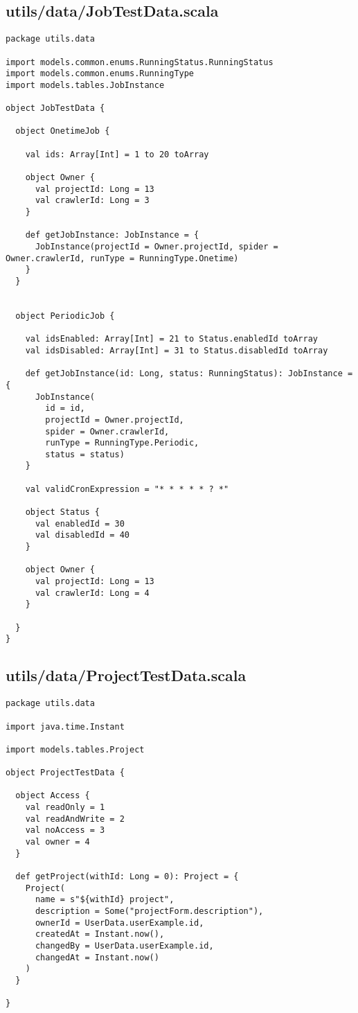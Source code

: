 \subsection{utils/data/JobTestData.scala}
\begin{lstlisting}
package utils.data

import models.common.enums.RunningStatus.RunningStatus
import models.common.enums.RunningType
import models.tables.JobInstance

object JobTestData {

  object OnetimeJob {

    val ids: Array[Int] = 1 to 20 toArray

    object Owner {
      val projectId: Long = 13
      val crawlerId: Long = 3
    }

    def getJobInstance: JobInstance = {
      JobInstance(projectId = Owner.projectId, spider = Owner.crawlerId, runType = RunningType.Onetime)
    }
  }


  object PeriodicJob {

    val idsEnabled: Array[Int] = 21 to Status.enabledId toArray
    val idsDisabled: Array[Int] = 31 to Status.disabledId toArray

    def getJobInstance(id: Long, status: RunningStatus): JobInstance = {
      JobInstance(
        id = id,
        projectId = Owner.projectId,
        spider = Owner.crawlerId,
        runType = RunningType.Periodic,
        status = status)
    }

    val validCronExpression = "* * * * * ? *"

    object Status {
      val enabledId = 30
      val disabledId = 40
    }

    object Owner {
      val projectId: Long = 13
      val crawlerId: Long = 4
    }

  }
}
\end{lstlisting}
\subsection{utils/data/ProjectTestData.scala}
\begin{lstlisting}
package utils.data

import java.time.Instant

import models.tables.Project

object ProjectTestData {

  object Access {
    val readOnly = 1
    val readAndWrite = 2
    val noAccess = 3
    val owner = 4
  }

  def getProject(withId: Long = 0): Project = {
    Project(
      name = s"${withId} project",
      description = Some("projectForm.description"),
      ownerId = UserData.userExample.id,
      createdAt = Instant.now(),
      changedBy = UserData.userExample.id,
      changedAt = Instant.now()
    )
  }

}
\end{lstlisting}

